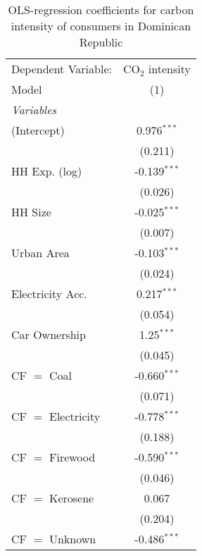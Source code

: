 
\begin{table}[htbp!]
   \centering
   \small
   \begin{adjustbox}{width = 1\textwidth, max height = 0.95\textheight, center}
      \begin{threeparttable}[b]
         \caption{\label{tab:OLS_1_DOM} OLS-regression coefficients for carbon intensity of consumers in Dominican Republic}
         \begin{tabular}{lc}
            \tabularnewline \midrule \midrule
            Dependent Variable: & CO$_{2}$ intensity\\  
            Model               & (1)\\  
            \midrule
            \emph{Variables}\\
            (Intercept)         & 0.976$^{***}$\\   
                                & (0.211)\\   
            HH Exp. (log)       & -0.139$^{***}$\\   
                                & (0.026)\\   
            HH Size             & -0.025$^{***}$\\   
                                & (0.007)\\   
            Urban Area          & -0.103$^{***}$\\   
                                & (0.024)\\   
            Electricity Acc.    & 0.217$^{***}$\\   
                                & (0.054)\\   
            Car Ownership       & 1.25$^{***}$\\   
                                & (0.045)\\   
            CF $=$ Coal         & -0.660$^{***}$\\   
                                & (0.071)\\   
            CF $=$ Electricity  & -0.778$^{***}$\\   
                                & (0.188)\\   
            CF $=$ Firewood     & -0.590$^{***}$\\   
                                & (0.046)\\   
            CF $=$ Kerosene     & 0.067\\   
                                & (0.204)\\   
            CF $=$ Unknown      & -0.486$^{***}$\\   

\end{tabular}
\end{threeparttable}
\end{adjustbox}
\end{table}
